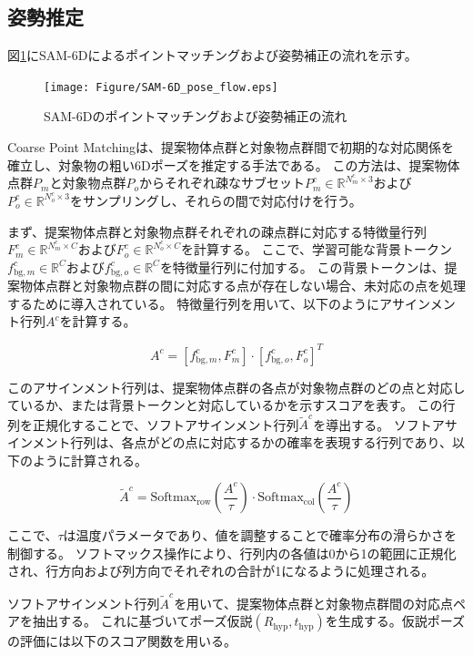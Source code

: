 \subsection{姿勢推定}
図\ref{fig:f6}にSAM-6Dによるポイントマッチングおよび姿勢補正の流れを示す。
\begin{figure}[htbt]
	\centering
	 \texttt{[image: Figure/SAM-6D\_pose\_flow.eps]}
	 \caption{SAM-6Dのポイントマッチングおよび姿勢補正の流れ}
	 \label{fig:f6}
\end{figure}

Coarse Point Matchingは、提案物体点群と対象物点群間で初期的な対応関係を確立し、対象物の粗い6Dポーズを推定する手法である。
この方法は、提案物体点群$P_m$と対象物点群$P_o$からそれぞれ疎なサブセット$P_m^c \in \mathbb{R}^{N_m^c \times 3}$および$P_o^c \in \mathbb{R}^{N_o^c \times 3}$をサンプリングし、それらの間で対応付けを行う。

まず、提案物体点群と対象物点群それぞれの疎点群に対応する特徴量行列$F_m^c \in \mathbb{R}^{N_m^c \times C}$および$F_o^c \in \mathbb{R}^{N_o^c \times C}$を計算する。
ここで、学習可能な背景トークン$f_{\text{bg}, m}^c \in \mathbb{R}^C$および$f_{\text{bg}, o}^c \in \mathbb{R}^C$を特徴量行列に付加する。
この背景トークンは、提案物体点群と対象物点群の間に対応する点が存在しない場合、未対応の点を処理するために導入されている。
特徴量行列を用いて、以下のようにアサインメント行列$A^c$を計算する。

\[
A^c = [f_{\text{bg}, m}^c, F_m^c] \cdot [f_{\text{bg}, o}^c, F_o^c]^T
\]

このアサインメント行列は、提案物体点群の各点が対象物点群のどの点と対応しているか、または背景トークンと対応しているかを示すスコアを表す。
この行列を正規化することで、ソフトアサインメント行列$\tilde{A}^c$を導出する。
ソフトアサインメント行列は、各点がどの点に対応するかの確率を表現する行列であり、以下のように計算される。

\[
\tilde{A}^c = \text{Softmax}_{\text{row}}\left(\frac{A^c}{\tau}\right) \cdot \text{Softmax}_{\text{col}}\left(\frac{A^c}{\tau}\right)
\]

ここで、$\tau$は温度パラメータであり、値を調整することで確率分布の滑らかさを制御する。
ソフトマックス操作により、行列内の各値は0から1の範囲に正規化され、行方向および列方向でそれぞれの合計が1になるように処理される。

ソフトアサインメント行列$\tilde{A}^c$を用いて、提案物体点群と対象物点群間の対応点ペアを抽出する。
これに基づいてポーズ仮説$(R_{\text{hyp}}, t_{\text{hyp}})$を生成する。仮説ポーズの評価には以下のスコア関数を用いる。

